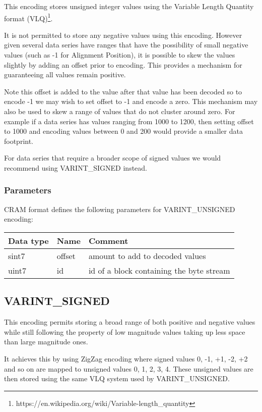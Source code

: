 \documentclass[a4paper]{article}
\begin{document}
This encoding stores unsigned integer values using the Variable Length Quantity
format (VLQ)\footnote{https://en.wikipedia.org/wiki/Variable-length\_quantity}.

It is not permitted to store any negative values using this encoding.
However given several data series have ranges that have the
possibility of small negative values (such as -1 for Alignment
Position), it is possible to skew the values slightly by adding an
offset prior to encoding.  This provides a mechanism for guaranteeing
all values remain positive.

Note this offset is added to the value after that value has been
decoded so to encode -1 we may wish to set offset to -1 and encode a
zero.  This mechanism may also be used to skew a range of values that
do not cluster around zero.  For example if a data series has values
ranging from 1000 to 1200, then setting offset to 1000 and encoding
values between 0 and 200 would provide a smaller data footprint.

For data series that require a broader scope of signed values we would
recommend using VARINT\_SIGNED instead.

\subsubsection*{Parameters}

CRAM format defines the following parameters for VARINT\_UNSIGNED encoding: 

\begin{tabular}{|>{\raggedright}p{100pt}|>{\raggedright}p{100pt}|>{\raggedright}p{230pt}|}
\hline
\textbf{Data type} & \textbf{Name} & \textbf{Comment}
\tabularnewline
\hline
sint7 & offset & amount to add to decoded values\tabularnewline
\hline
uint7 & id & id of a block containing the byte stream\tabularnewline
\hline
\end{tabular}

\subsection{VARINT\_SIGNED}

This encoding permits storing a broad range of both positive and
negative values while still following the property of low magnitude
values taking up less space than large magnitude ones.

It achieves this by using ZigZag encoding where signed values 0, -1,
+1, -2, +2 and so on are mapped to unsigned values 0, 1, 2, 3, 4.
These unsigned values are then stored using the same VLQ system used
by VARINT\_UNSIGNED.
\end{document}
